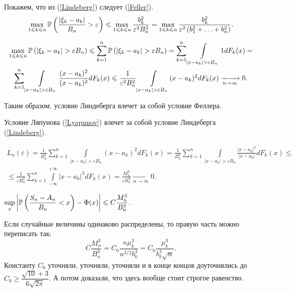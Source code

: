 \documentclass[../TV&MS.tex]{subfiles}
\begin{document}
\begin{Proof}
    Покажем, что из (\ref{Lindeberg}) следует (\ref{Feller}).
\[    
    \max_{1 \leqslant k \leqslant n} \mathbb{P} \left( \frac{ \left| \xi_k - 
    a_k \right|}{B_n} > \varepsilon \right) \leqslant \max_{1 \leqslant k 
    \leqslant n} \frac{b_k^2}{\varepsilon^2 B_n^2} = \max_{1 \leqslant k 
    \leqslant n} \frac{b_k^2}{\varepsilon^2 \left( b_1^2 +  \ldots + b_n^2 \right) }.
\]

\begin{multline*}
	\max_{1 \leqslant k \leqslant n} \mathbb{P} \left( \left| \xi_k - a_k \right| > 
	\varepsilon B_n \right)\leqslant\sum\limits_{k=1}^{n} \mathbb{P} \left( \left| 
	\xi_k - a_k \right| > \varepsilon B_n \right)=\sum\limits_{k=1}^{n} 
	\int\limits_{ \left| x - a_k \right| > \varepsilon B_n}^{} 1 dF_k(x) = \\
    \sum\limits_{k=1}^{n} \int\limits_{ \left| x - a_k \right| > \varepsilon B_n}^{} 
    \frac{(x - a_k)^2}{(x - a_k)^2} dF_k(x) \leqslant \frac{1}{\varepsilon^2 B_n^2} 
    \int\limits_{ \left| x - a_k \right| > \varepsilon B_n}^{} (x - a_k)^2 dF_k(x) 
    \xrightarrow[n \rightarrow \infty]{} 0.
\end{multline*} 

    Таким образом, условие Линдеберга влечет за собой условие Феллера.
\end{Proof} 

\begin{Th}
    Условие Ляпунова (\ref{Lyapunov}) влечет за собой условие Линдеберга (\ref{Lindeberg}).
\end{Th}

\begin{Proof}
\begin{multline*}
	L_n(\varepsilon) = \frac{1}{B_n^2} \sum\limits_{k=1}^{n}  
	\int\limits_{ \left| x - a_k \right| > \varepsilon B_n}^{} (x - a_k)^2 dF_k(x) = 
    \frac{1}{B_n^2} \sum\limits_{k=1}^{n} \int\limits_{ \left| x - a_k \right| > 
    \varepsilon B_n}^{} \frac{|x - a_k|^3}{|x - a_k|} dF_k(x) \leqslant\\
    \leqslant \frac{1}{\varepsilon B_n^3} \sum\limits_{k=1}^{n} 
    \int\limits_{-\infty}^{+\infty} \left| x - a_k \right|^3 dF_k(x) = 
    \frac{M_n^3}{\varepsilon B_n^3} \xrightarrow[n \rightarrow \infty]{} 0.
\end{multline*}
\end{Proof} 

\begin{Th}
    $\sup\limits_{x} \left| \mathbb{P} \left( \dfrac{S_n - A_n}{B_n} < x \right) - 
    \Phi(x) \right| \leqslant C\dfrac{M_n^3}{B_n^3}$.

    Если случайные величины одинаково распределены, то правую часть можно переписать так:
\[
    C \frac{M_n^3}{B_n^3} = C_0 \frac{n \mu_k^3}{n^{3/2} b_k^3} =
    C_0 \frac{\mu_k^3}{b_k^3 \sqrt{n}}.
\] 
    Константу $C_0$ уточняли, уточняли, уточняли и в конце концов доуточнялись до 
    $C_0 \geqslant \dfrac{\sqrt{10} + 3}{6 \sqrt{2 \pi}}$. А потом доказали, 
    что здесь вообще стоит строгое равенство.
\end{Th}

\newpage
\end{document}

